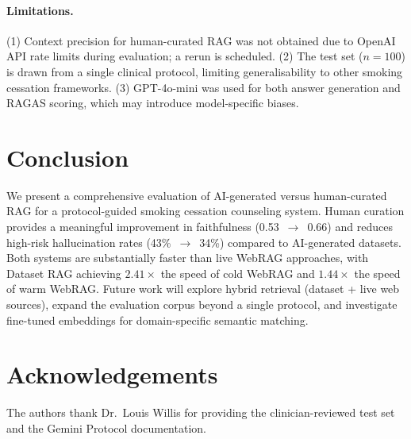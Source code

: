 \documentclass[11pt,a4paper]{article}
\begin{document}
\paragraph{Limitations.}
(1) Context precision for human-curated RAG was not obtained due to
OpenAI API rate limits during evaluation; a rerun is scheduled.
(2) The test set ($n=100$) is drawn from a single clinical protocol,
limiting generalisability to other smoking cessation frameworks.
(3) GPT-4o-mini was used for both answer generation and RAGAS scoring,
which may introduce model-specific biases.

\section{Conclusion}

We present a comprehensive evaluation of AI-generated versus human-curated RAG
for a protocol-guided smoking cessation counseling system.
Human curation provides a meaningful improvement in faithfulness (0.53~$\to$~0.66)
and reduces high-risk hallucination rates (43\%~$\to$~34\%) compared to
AI-generated datasets.
Both systems are substantially faster than live WebRAG approaches,
with Dataset RAG achieving $2.41\times$ the speed of cold WebRAG and
$1.44\times$ the speed of warm WebRAG.
Future work will explore hybrid retrieval (dataset + live web sources),
expand the evaluation corpus beyond a single protocol, and investigate
fine-tuned embeddings for domain-specific semantic matching.

\section*{Acknowledgements}
The authors thank Dr.\ Louis Willis for providing the clinician-reviewed
test set and the Gemini Protocol documentation.


\end{document}
